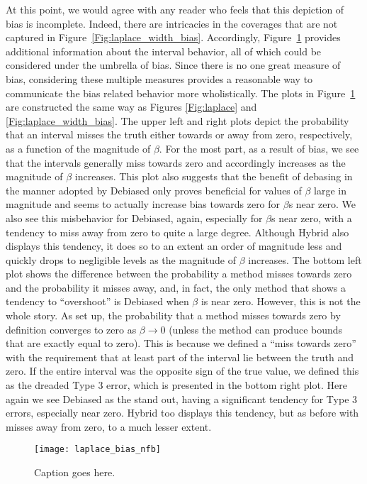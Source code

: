 At this point, we would agree with any reader who feels that this depiction of bias is incomplete. Indeed, there are intricacies in the coverages that are not captured in Figure~\ref{Fig:laplace_width_bias}. Accordingly, Figure~\ref{Fig:laplace_bias_nfb} provides additional information about the interval behavior, all of which could be considered under the umbrella of bias. Since there is no one great measure of bias, considering these multiple measures provides a reasonable way to communicate the bias related behavior more wholistically. The plots in Figure~\ref{Fig:laplace_bias_nfb} are constructed the same way as Figures \ref{Fig:laplace} and \ref{Fig:laplace_width_bias}. The upper left and right plots depict the probability that an interval misses the truth either towards or away from zero, respectively, as a function of the magnitude of $\beta$. For the most part, as a result of bias, we see that the intervals generally miss towards zero and accordingly increases as the magnitude of $\beta$ increases. This plot also suggests that the benefit of debasing in the manner adopted by Debiased only proves beneficial for values of $\beta$ large in magnitude and seems to actually increase bias towards zero for $\beta$s near zero. We also see this misbehavior for Debiased, again, especially for $\beta$s near zero, with a tendency to miss away from zero to quite a large degree. Although Hybrid also displays this tendency, it does so to an extent an order of magnitude less and quickly drops to negligible levels as the magnitude of $\beta$ increases. The bottom left plot shows the difference between the probability a method misses towards zero and the probability it misses away, and, in fact, the only method that shows a tendency to ``overshoot'' is Debiased when $\beta$ is near zero. However, this is not the whole story. As set up, the probability that a method misses towards zero by definition converges to zero as $\beta \rightarrow 0$ (unless the method can produce bounds that are exactly equal to zero). This is because we defined a ``miss towards zero'' with the requirement that at least part of the interval lie between the truth and zero. If the entire interval was the opposite sign of the true value, we defined this as the dreaded Type 3 error, which is presented in the bottom right plot. Here again we see Debiased as the stand out, having a significant tendency for Type 3 errors, especially near zero. Hybrid too displays this tendency, but as before with misses away from zero, to a much lesser extent.

\begin{figure}[hbtp]
  \texttt{[image: laplace\_bias\_nfb]}
  \caption{\label{Fig:laplace_bias_nfb} Caption goes here.}
\end{figure}

